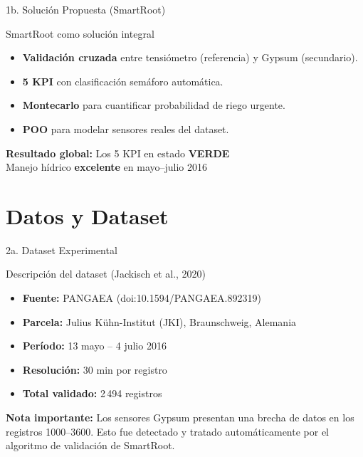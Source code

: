 \documentclass[11pt, aspectratio=169]{beamer}
\newcommand{\semverde}[1]{\textcolor{SmartGreen}{\textbf{#1}}}
\newcommand{\tick}{\textcolor{SmartGreen}{\ding{52}}}
\begin{document}
\begin{frame}{1b. Solución Propuesta (SmartRoot)}
\begin{block}{SmartRoot como solución integral}
\begin{itemize}
    \item[\tick] \textbf{Validación cruzada} entre tensiómetro (referencia) y Gypsum (secundario).
    \item[\tick] \textbf{5 KPI} con clasificación semáforo automática.
    \item[\tick] \textbf{Montecarlo} para cuantificar probabilidad de riego urgente.
    \item[\tick] \textbf{POO} para modelar sensores reales del dataset.
\end{itemize}
\end{block}

\vfill

\begin{tcolorbox}[colback=SmartGreen!10,colframe=SmartGreen!50,
    arc=4pt,left=6pt,right=6pt,top=4pt,bottom=4pt]
\centering
\textbf{Resultado global:} Los 5 KPI en estado \semverde{VERDE}\\
Manejo hídrico \textbf{excelente} en mayo--julio 2016
\end{tcolorbox}
\end{frame}

\section{Datos y Dataset}

\begin{frame}{2a. Dataset Experimental}
\begin{block}{Descripción del dataset (Jackisch et al., 2020)}
\begin{itemize}
    \item \textbf{Fuente:} PANGAEA (doi:10.1594/PANGAEA.892319)
    \item \textbf{Parcela:} Julius Kühn-Institut (JKI), Braunschweig, Alemania
    \item \textbf{Período:} 13 mayo -- 4 julio 2016
    \item \textbf{Resolución:} 30 min por registro
    \item \textbf{Total validado:} 2\,494 registros
\end{itemize}
\end{block}

\vfill

\begin{tcolorbox}[colback=SmartOrange!12,colframe=SmartOrange!50,
    arc=4pt,left=6pt,right=6pt,top=4pt,bottom=4pt]
\textbf{Nota importante:} Los sensores Gypsum presentan una brecha de datos en los registros 1000--3600. Esto fue detectado y tratado automáticamente por el algoritmo de validación de SmartRoot.
\end{tcolorbox}
\end{frame}
\end{document}
